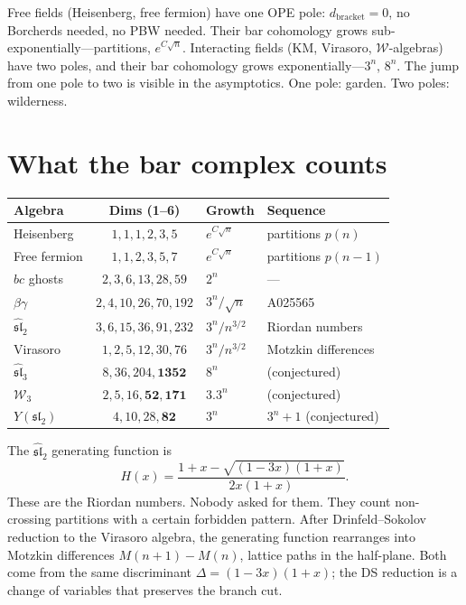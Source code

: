 \documentclass[11pt]{article}
\newcommand{\cW}{\mathcal{W}}
\newcommand{\fsl}{\mathfrak{sl}}
\begin{document}
Free fields (Heisenberg, free fermion) have one OPE pole:
$d_{\mathrm{bracket}} = 0$, no Borcherds needed, no PBW needed.
Their bar cohomology grows sub-exponentially---partitions,
$e^{C\sqrt{n}}$.  Interacting fields (KM, Virasoro, $\cW$-algebras)
have two poles, and their bar cohomology grows
exponentially---$3^n$, $8^n$.  The jump from one pole to two is
visible in the asymptotics.  One pole: garden.  Two poles:
wilderness.


\section{What the bar complex counts}
\label{sec:bestiary}

\begin{center}
\small
\renewcommand{\arraystretch}{1.15}
\begin{tabular}{lcll}
\textbf{Algebra} & \textbf{Dims (1--6)}
  & \textbf{Growth} & \textbf{Sequence}\\
\hline
Heisenberg & $1,1,1,2,3,5$ & $e^{C\sqrt{n}}$
  & partitions $p(n)$ \\
Free fermion & $1,1,2,3,5,7$ & $e^{C\sqrt{n}}$
  & partitions $p(n{-}1)$ \\
$bc$ ghosts & $2,3,6,13,28,59$ & $2^n$
  & --- \\
$\beta\gamma$ & $2,4,10,26,70,192$ & $3^n/\sqrt{n}$
  & A025565 \\
$\widehat{\fsl}_2$ & $3,6,15,36,91,232$ & $3^n/n^{3/2}$
  & Riordan numbers \\
Virasoro & $1,2,5,12,30,76$ & $3^n/n^{3/2}$
  & Motzkin differences \\
$\widehat{\fsl}_3$ & $8,36,204,\mathbf{1352}$
  & $8^n$ & (conjectured) \\
$\cW_3$ & $2,5,16,\mathbf{52},\mathbf{171}$
  & $3.3^n$ & (conjectured) \\
$Y(\fsl_2)$ & $4,10,28,\mathbf{82}$
  & $3^n$ & $3^n + 1$ (conjectured)
\end{tabular}
\end{center}

The $\widehat{\fsl}_2$ generating function is
\[
H(x) = \frac{1 + x - \sqrt{(1-3x)(1+x)}}{2x(1+x)}.
\]
These are the Riordan numbers.  Nobody asked for them.
They count non-crossing partitions
with a certain forbidden pattern.  After Drinfeld--Sokolov reduction
to the Virasoro algebra, the generating function rearranges into
Motzkin differences $M(n{+}1) - M(n)$, lattice paths in the
half-plane.  Both come from the same discriminant
$\Delta = (1-3x)(1+x)$; the DS reduction is a change of variables
that preserves the branch cut.
\end{document}
